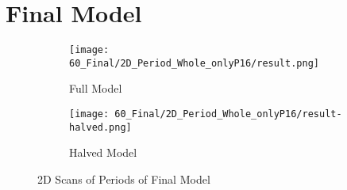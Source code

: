\chapter{Final Model}




\begin{figure}
    \centering
    \begin{subfigure}{0.4\textwidth}
        \centering
        \texttt{[image: 60\_Final/2D\_Period\_Whole\_onlyP16/result.png]}
        \caption{Full Model}
        \label{fig:final.period.whole.full}
    \end{subfigure}
    \begin{subfigure}{0.4\textwidth}
        \centering
        \texttt{[image: 60\_Final/2D\_Period\_Whole\_onlyP16/result-halved.png]}
        \caption{Halved Model}
        \label{fig:final.period.whole.halved}
    \end{subfigure}
    \caption{2D Scans of Periods of Final Model}
\end{figure}





